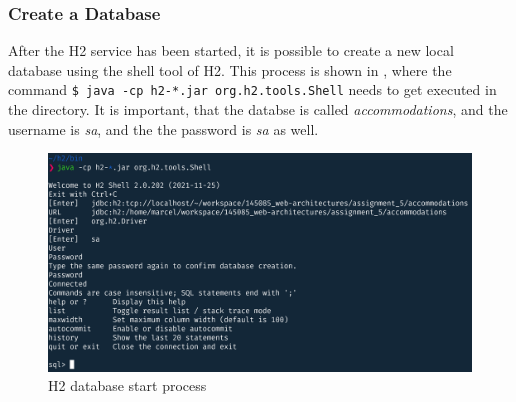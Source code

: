 \subsubsection{Create a Database}\label{sec:03_depl_h2_create}
After the H2 service has been started, it is possible to create a new local database using the shell tool of H2. This process is shown in , where the command \texttt{\$ java -cp h2-*.jar org.h2.tools.Shell} needs to get executed in the  directory. It is important, that the databse is called \textit{accommodations}, and the username is \textit{sa}, and the the password is \textit{sa} as well.
\begin{figure}[h]
\centering
\includegraphics[scale=0.18]{images/03_depl/create-db}
\caption{H2 database start process}
\label{fig:03_depl_createdb_create}
\end{figure}

